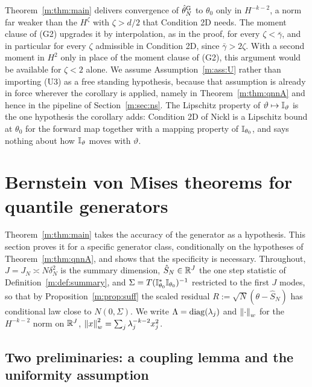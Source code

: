 \begin{remark}\label{m:rem:plugin}
Theorem~\ref{m:thm:main} delivers convergence of $\hat\theta^{\rm G}_N$ to $\theta_0$ only in $H^{-k-2}$, a norm far weaker than the $H^\zeta$ with $\zeta>d/2$ that Condition 2D needs. The moment clause of (G2) upgrades it by interpolation, as in the proof, for every $\zeta<\bar\gamma$, and in particular for every $\zeta$ admissible in Condition 2D, since $\bar\gamma>2\zeta$. With a second moment in $H^2$ only in place of the moment clause of (G2), this argument would be available for $\zeta<2$ alone. We assume Assumption~\ref{m:ass:U} rather than importing (U3) as a free standing hypothesis, because that assumption is already in force wherever the corollary is applied, namely in Theorem~\ref{m:thm:qnnA} and hence in the pipeline of Section~\ref{m:sec:ns}. The Lipschitz property of $\vartheta\mapsto\mathbb{I}_\vartheta$ is the one hypothesis the corollary adds: Condition 2D of Nickl is a Lipschitz bound at $\theta_0$ for the forward map together with a mapping property of $\mathbb{I}_{\theta_0}$, and says nothing about how $\mathbb{I}_\vartheta$ moves with $\vartheta$.
\end{remark}

\section{Bernstein von Mises theorems for quantile generators}\label{m:sec:qnn}

Theorem~\ref{m:thm:main} takes the accuracy of the generator as a hypothesis. This section proves it for a specific generator class, conditionally on the hypotheses of Theorem~\ref{m:thm:qnnA}, and shows that the specificity is necessary. Throughout, $J=J_N\asymp N\delta_N^2$ is the summary dimension, $\hat S_N\in\mathbb{R}^J$ the one step statistic of Definition~\ref{m:def:summary}, and $\Sigma=T(\mathbb{I}^*_{\theta_0}\mathbb{I}_{\theta_0})^{-1}$ restricted to the first $J$ modes, so that by Proposition~\ref{m:prop:suff} the scaled residual $R:=\sqrt N(\theta-\hat S_N)$ has conditional law close to $N(0,\Sigma)$. We write $\Lambda=\operatorname{diag}(\lambda_j)$ and $\left\|\cdot\right\|_w$ for the $H^{-k-2}$ norm on $\mathbb{R}^J$, $\left\|x\right\|_w^2=\sum_j\lambda_j^{-k-2}x_j^2$.

\subsection{Two preliminaries: a coupling lemma and the uniformity assumption}

